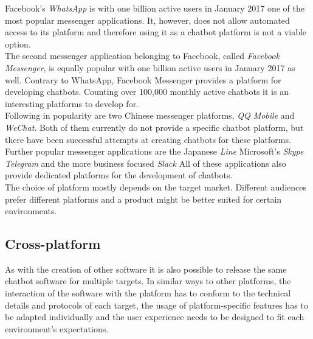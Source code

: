 Facebook's \emph{WhatsApp} is with one billion active users in January 2017\cite{fbpopular} one of the most popular messenger applications. It, however, does not allow automated access to its platform and therefore using it as a chatbot platform is not a viable option.
\\

The second messenger application belonging to Facebook, called \emph{Facebook Messenger}, is equally popular with one billion active users in January 2017\cite{fbpopular} as well. Contrary to WhatsApp, Facebook Messenger provides a platform for developing chatbots. Counting over 100,000 monthly active chatbots\cite{messenger} it is an interesting platforms to develop for.
\\

Following in popularity\cite{appusage} are two Chinese messenger platforms, \emph{QQ Mobile} and \emph{WeChat}. Both of them currently do not provide a specific chatbot platform, but there have been successful attempts at creating chatbots for these platforms\cite{wechatbot}.
\\

Further popular messenger applications are the Japanese \emph{Line} Microsoft's \emph{Skype} \emph{Telegram} and the more business focused \emph{Slack} All of these applications also provide dedicated platforms for the development of chatbots.
\\

The choice of platform mostly depends on the target market. Different audiences prefer different platforms and a product might be better suited for certain environments.


\subsection{Cross-platform}

As with the creation of other software it is also possible to release the same chatbot software for multiple targets. In similar ways to other platforms, the interaction of the software with the platform has to conform to the technical details and protocols of each target, the usage of platform-specific features has to be adapted individually and the user experience needs to be designed to fit each environment's expectations.
\\

